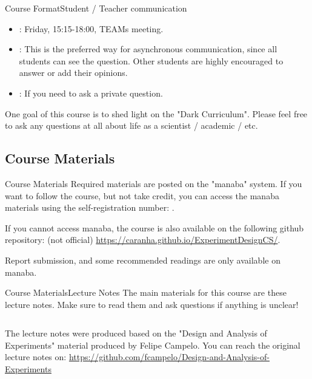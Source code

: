 \documentclass{beamer}
\begin{document}
\begin{CJK}{UTF8}{ipxm}
\begin{frame}{Course Format}{Student / Teacher communication}
  \begin{itemize}
    \item {}: Friday, 15:15-18:00, TEAMs meeting.\bigskip

    \item {}: This is the preferred way for asynchronous communication, since all students can see the question. Other students are highly encouraged to answer or add their opinions.\bigskip

    \item {}: If you need to ask a private question.
  \end{itemize}\bigskip

  One goal of this course is to shed light on the "Dark Curriculum". Please feel free to ask any questions at all about life as a scientist / academic / etc.
\end{frame}


\subsection{Course Materials}
\begin{frame}{Course Materials}
  Required materials are posted on the "manaba" system. If you want to follow the course, but not take credit, you can access the manaba materials using the self-registration number: .
  \bigskip

  If you cannot access manaba, the course is also available on the following github repository: (not official) \url{https://caranha.github.io/ExperimentDesignCS/}.
  \bigskip

  Report submission, and some recommended readings are only available on manaba.
\end{frame}

\begin{frame}{Course Materials}{Lecture Notes}
  The main materials for this course are these lecture notes.
  Make sure to read them and ask questions if anything is unclear!
  \vspace{1cm}

  \begin{columns}
    The lecture notes were produced based on the "Design and Analysis of Experiments" material produced by Felipe Campelo. You can reach the original lecture notes on: \url{https://github.com/fcampelo/Design-and-Analysis-of-Experiments}


\end{columns}
\end{frame}
\end{CJK}
\end{document}
